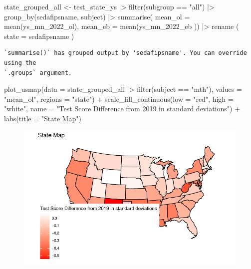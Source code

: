 \documentclass[
  letterpaper,
  DIV=11,
  numbers=noendperiod]{scrartcl}
\newenvironment{Shaded}{\begin{snugshade}}{\end{snugshade}}
\newcommand{\AttributeTok}[1]{\textcolor[rgb]{0.40,0.45,0.13}{#1}}
\newcommand{\FunctionTok}[1]{\textcolor[rgb]{0.28,0.35,0.67}{#1}}
\newcommand{\NormalTok}[1]{\textcolor[rgb]{0.00,0.23,0.31}{#1}}
\newcommand{\OtherTok}[1]{\textcolor[rgb]{0.00,0.23,0.31}{#1}}
\newcommand{\SpecialCharTok}[1]{\textcolor[rgb]{0.37,0.37,0.37}{#1}}
\newcommand{\StringTok}[1]{\textcolor[rgb]{0.13,0.47,0.30}{#1}}
\begin{document}
\begin{Shaded}
\begin{Highlighting}[]
\NormalTok{state\_grouped\_all }\OtherTok{\textless{}{-}}\NormalTok{ test\_state\_ys }\SpecialCharTok{|\textgreater{}}
  \FunctionTok{filter}\NormalTok{(subgroup }\SpecialCharTok{==} \StringTok{"all"}\NormalTok{) }\SpecialCharTok{|\textgreater{}}
  \FunctionTok{group\_by}\NormalTok{(sedafipsname, subject) }\SpecialCharTok{|\textgreater{}}
  \FunctionTok{summarise}\NormalTok{( }\AttributeTok{mean\_ol =} \FunctionTok{mean}\NormalTok{(ys\_mn\_2022\_ol), }\AttributeTok{mean\_eb =} \FunctionTok{mean}\NormalTok{(ys\_mn\_2022\_eb}
\NormalTok{)) }\SpecialCharTok{|\textgreater{}}
  \FunctionTok{rename}\NormalTok{ (}
    \AttributeTok{state =}\NormalTok{ sedafipsname}
\NormalTok{  )}
\end{Highlighting}
\end{Shaded}

\begin{verbatim}
`summarise()` has grouped output by 'sedafipsname'. You can override using the
`.groups` argument.
\end{verbatim}

\begin{Shaded}
\begin{Highlighting}[]
\FunctionTok{plot\_usmap}\NormalTok{(}\AttributeTok{data =}\NormalTok{ state\_grouped\_all }\SpecialCharTok{|\textgreater{}} \FunctionTok{filter}\NormalTok{(subject }\SpecialCharTok{==} \StringTok{"mth"}\NormalTok{), }\AttributeTok{values =} \StringTok{"mean\_ol"}\NormalTok{, }\AttributeTok{regions =} \StringTok{"state"}\NormalTok{) }\SpecialCharTok{+}
  \FunctionTok{scale\_fill\_continuous}\NormalTok{(}\AttributeTok{low =} \StringTok{"red"}\NormalTok{, }\AttributeTok{high =} \StringTok{"white"}\NormalTok{, }\AttributeTok{name =} \StringTok{"Test Score Difference from 2019 in standard deviations"}\NormalTok{) }\SpecialCharTok{+} 
  \FunctionTok{labs}\NormalTok{(}\AttributeTok{title =} \StringTok{"State Map"}\NormalTok{)}
\end{Highlighting}
\end{Shaded}

\begin{figure}[H]

{\centering \includegraphics{GeospatialMapping_files/figure-pdf/mapping-test-scores-1.pdf}

}

\end{figure}
\end{document}
